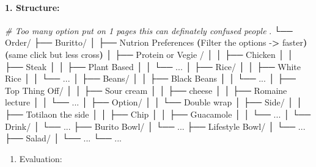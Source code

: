 \documentclass[
]{article}
\newenvironment{Shaded}{\begin{snugshade}}{\end{snugshade}}
\newcommand{\AttributeTok}[1]{\textcolor[rgb]{0.77,0.63,0.00}{#1}}
\newcommand{\BuiltInTok}[1]{#1}
\newcommand{\CommentTok}[1]{\textcolor[rgb]{0.56,0.35,0.01}{\textit{#1}}}
\newcommand{\ErrorTok}[1]{\textcolor[rgb]{0.64,0.00,0.00}{\textbf{#1}}}
\newcommand{\ExtensionTok}[1]{#1}
\newcommand{\KeywordTok}[1]{\textcolor[rgb]{0.13,0.29,0.53}{\textbf{#1}}}
\newcommand{\NormalTok}[1]{#1}
\newcommand{\OperatorTok}[1]{\textcolor[rgb]{0.81,0.36,0.00}{\textbf{#1}}}
\providecommand{\tightlist}{%
  \setlength{\itemsep}{0pt}\setlength{\parskip}{0pt}}
\begin{document}
\hypertarget{structure-1}{%
\paragraph{1. Structure:}\label{structure-1}}

\begin{Shaded}
\begin{Highlighting}[]
\CommentTok{\# Too many option put on 1 pages this can definately confused people}
\BuiltInTok{.}
\ExtensionTok{└──}\NormalTok{ Order/}
    \ExtensionTok{├──}\NormalTok{ Buritto/}
    \ExtensionTok{│}\NormalTok{   ├── Nutrion Preferences }\ErrorTok{(}\ExtensionTok{Filter}\NormalTok{ the options }\AttributeTok{{-}}\OperatorTok{\textgreater{}}\NormalTok{ faster}\KeywordTok{)(}\ExtensionTok{same}\NormalTok{ click but less cross}\KeywordTok{)}
    \ExtensionTok{│}\NormalTok{   ├── Protein or Vegie /}
    \ExtensionTok{│}\NormalTok{   │   ├── Chicken}
    \ExtensionTok{│}\NormalTok{   │   ├── Steak}
    \ExtensionTok{│}\NormalTok{   │   ├── Plant Based}
    \ExtensionTok{│}\NormalTok{   │   └── ...}
    \ExtensionTok{│}\NormalTok{   ├── Rice/}
    \ExtensionTok{│}\NormalTok{   │   ├── White Rice}
    \ExtensionTok{│}\NormalTok{   │   └── ...}
    \ExtensionTok{│}\NormalTok{   ├── Beans/}
    \ExtensionTok{│}\NormalTok{   │   ├── Black Beans}
    \ExtensionTok{│}\NormalTok{   │   └── ...}
    \ExtensionTok{│}\NormalTok{   ├── Top Thing Off/}
    \ExtensionTok{│}\NormalTok{   │   ├── Sour cream}
    \ExtensionTok{│}\NormalTok{   │   ├── cheese}
    \ExtensionTok{│}\NormalTok{   │   ├── Romaine lecture}
    \ExtensionTok{│}\NormalTok{   │   └── ...}
    \ExtensionTok{│}\NormalTok{   ├── Option/}
    \ExtensionTok{│}\NormalTok{   │   └── Double wrap}
    \ExtensionTok{│}\NormalTok{   ├── Side/}
    \ExtensionTok{│}\NormalTok{   │   ├── Totilaon the side}
    \ExtensionTok{│}\NormalTok{   │   ├── Chip}
    \ExtensionTok{│}\NormalTok{   │   ├── Guacamole}
    \ExtensionTok{│}\NormalTok{   │   └── ...}
    \ExtensionTok{│}\NormalTok{   └── Drink/}
    \ExtensionTok{│}\NormalTok{       └── ...}
    \ExtensionTok{├──}\NormalTok{ Burito Bowl/}
    \ExtensionTok{│}\NormalTok{   └── ...}
    \ExtensionTok{├──}\NormalTok{ Lifestyle Bowl/}
    \ExtensionTok{│}\NormalTok{   └── ...}
    \ExtensionTok{├──}\NormalTok{ Salad/}
    \ExtensionTok{│}\NormalTok{   └── ...}
    \ExtensionTok{└──}\NormalTok{ ...}
\end{Highlighting}
\end{Shaded}

\begin{enumerate}
\def\labelenumi{\arabic{enumi}.}
\setcounter{enumi}{1}
\tightlist
\item
  Evaluation:
\end{enumerate}
\end{document}
